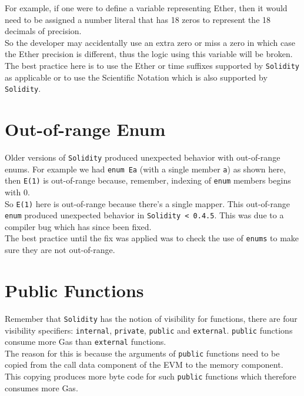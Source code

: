 For example, if one were to define a variable representing Ether, then it would need to be assigned a number literal that has 18 zeros to represent the 18 decimals of precision.\\

So the developer may accidentally use an extra zero or miss a zero in which case the Ether precision is different, thus the logic using this variable will be broken.\\

The best practice here is to use the Ether or time suffixes supported by \texttt{Solidity} as applicable or to use the Scientific Notation which is also supported by \texttt{Solidity}.

\section{Out-of-range Enum}
Older versions of \texttt{Solidity} produced unexpected behavior with out-of-range enums. For example we had \texttt{enum E{a}} (with a single member \texttt{a}) as shown here, then \texttt{E(1)} is out-of-range because, remember, indexing of \texttt{enum} members begins with 0. \\

So \texttt{E(1)} here is out-of-range because there's a single mapper. This out-of-range \texttt{enum} produced unexpected behavior in \texttt{Solidity < 0.4.5}. This was due to a compiler bug which has since been fixed.\\

The best practice until the fix was applied was to check the use of \texttt{enums} to make sure they are not out-of-range.

\section{Public Functions}
Remember that \texttt{Solidity} has the notion of visibility for functions, there are four visibility specifiers: \texttt{internal}, \texttt{private}, \texttt{public} and \texttt{external}. \texttt{public} functions consume more Gas than \texttt{external} functions. \\

The reason for this is because the arguments of \texttt{public} functions need to be copied from the call data component of the EVM to the memory component. This copying produces more byte code for such \texttt{public} functions which therefore consumes more Gas. \\

